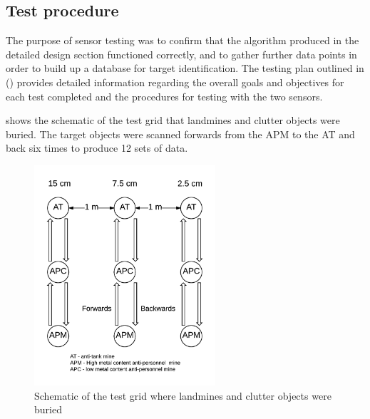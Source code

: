 \documentclass[main.tex]{subfiles}
\begin{document}
\subsection{Test procedure}
The purpose of sensor testing was to confirm that the algorithm produced in the detailed design section functioned correctly, and to gather further data points in order to build up a database for target identification. The testing plan outlined in () provides detailed information regarding the overall goals and objectives for each test completed and the procedures for testing with the two sensors. 

 shows the schematic of the test grid that landmines and clutter objects were buried. The target objects were scanned forwards from the APM to the AT and back six times to produce 12 sets of data. 

\begin{figure}[ht]
\includegraphics[width=0.6\textwidth]{5-Testing/testlane.png}
\centering
\caption[Schematic of test grid]{Schematic of the test grid where landmines and clutter objects were buried}
\end{figure}
\end{document}
